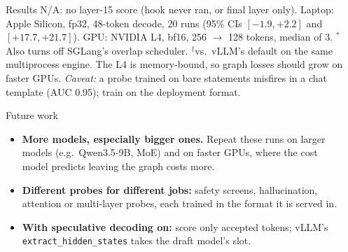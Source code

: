\documentclass[final]{beamer}
\newlength{\sepwidth}
\newlength{\colwidth}
\newcommand{\separatorcolumn}{\begin{column}{\sepwidth}\end{column}}
\begin{document}
\begin{frame}[t]
\begin{columns}[t]
\begin{column}{\colwidth}
\begin{block}{Results}
    {\footnotesize N/A: no layer-15 score (hook never ran, or final layer only).
    Laptop: Apple Silicon, fp32, 48-token decode, 20 runs (95\% CIs
    $[-1.9, +2.2]$ and $[+17.7, +21.7]$). GPU: NVIDIA L4, bf16, 256 $\rightarrow$ 128
    tokens, median of 3. $^*$Also turns off SGLang's overlap scheduler.
    $^\dagger$vs.\ vLLM's default on the same multiprocess engine. The L4 is
    memory-bound, so graph losses should grow on faster GPUs.
    \textit{Caveat:} a probe trained on bare statements misfires in a chat
    template (AUC 0.95); train on the deployment format.}

  \end{block}

  \begin{block}{Future work}

    \begin{itemize}
      \item \textbf{More models, especially bigger ones.} Repeat these runs on
        larger models (e.g.\ Qwen3.5-9B, MoE) and on faster GPUs, where
        the cost model predicts leaving the graph costs more.
      \item \textbf{Different probes for different jobs:} safety screens,
        hallucination, attention or multi-layer probes, each trained in the
        format it is served in.
      \item \textbf{With speculative decoding on:} score only accepted tokens;
        vLLM's \texttt{extract\_hidden\_states} takes the draft model's slot.
    \end{itemize}

  \end{block}


\end{column}

\separatorcolumn
\end{columns}
\end{frame}
\end{document}
